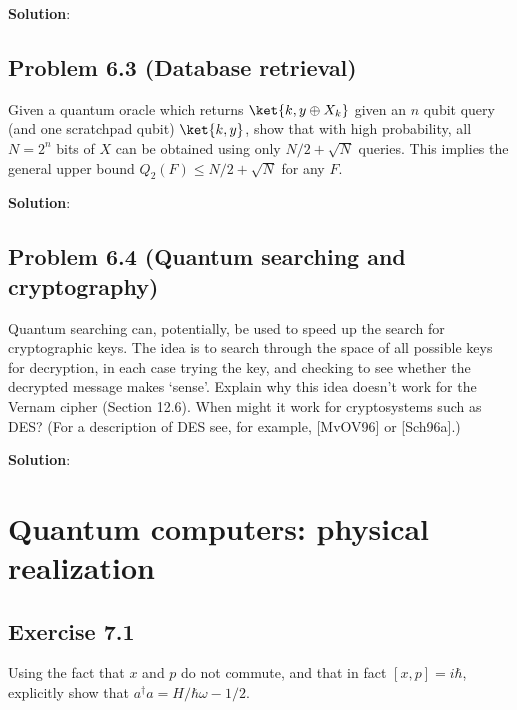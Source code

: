 \documentclass{book}
\begin{document}
    \textbf{Solution}:

\section*{Problem 6.3 (Database retrieval)}
    Given a quantum oracle which returns $\ket{k,y\oplus X_k}$ given an $n$ qubit query (and one scratchpad qubit) $\ket{k,y}$, show that with high probability, all $N=2^n$ bits of $X$ can be obtained using only $N/2 + \sqrt{N}$ queries. This implies the general upper bound $Q_2(F) \leq N/2 +\sqrt{N}$ for any $F$.
    
    \textbf{Solution}:

\section*{Problem 6.4 (Quantum searching and cryptography)}
    Quantum searching can, potentially, be used to speed up the search for cryptographic keys. The idea is to search through the space of all possible keys for decryption, in each case trying the key, and checking to see whether the decrypted message makes ‘sense’. Explain why this idea doesn’t work for the Vernam cipher (Section 12.6). When might it work for cryptosystems such as DES? (For a description of DES see, for example, [MvOV96] or [Sch96a].)
    
    \textbf{Solution}:

\chapter{Quantum computers: physical realization}

\section*{Exercise 7.1}
    Using the fact that $x$ and $p$ do not commute, and that in fact $[x,p]=i\hbar$, explicitly show that $a^\dagger a= H/\hbar\omega -1/2$.
    
\end{document}
